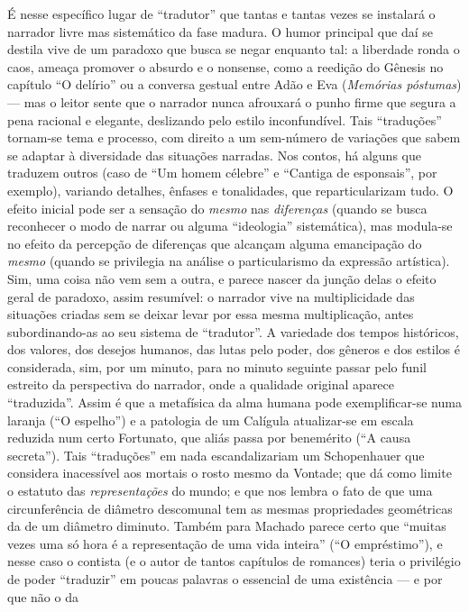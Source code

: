 É nesse específico lugar de ``tradutor'' que tantas e tantas vezes se
instalará o narrador livre mas sistemático da fase madura. O humor
principal que daí se destila vive de um paradoxo que busca se negar
enquanto tal: a liberdade ronda o caos, ameaça promover o absurdo e o
nonsense, como a reedição do Gênesis no capítulo ``O delírio'' ou a
conversa gestual entre Adão e Eva (\emph{Memórias póstumas}) --- mas o
leitor sente que o narrador nunca afrouxará o punho firme que segura a
pena racional e elegante, deslizando pelo estilo inconfundível. Tais
``traduções'' tornam-se tema e processo, com direito a um sem-número de
variações que sabem se adaptar à diversidade das situações narradas. Nos
contos, há alguns que traduzem outros (caso de ``Um homem célebre'' e
``Cantiga de esponsais'', por exemplo), variando detalhes, ênfases e
tonalidades, que reparticularizam tudo. O efeito inicial pode ser a
sensação do \emph{mesmo} nas \emph{diferenças} (quando se busca
reconhecer o modo de narrar ou alguma ``ideologia'' sistemática), mas
modula-se no efeito da percepção de diferenças que alcançam alguma
emancipação do \emph{mesmo} (quando se privilegia na análise o
particularismo da expressão artística). Sim, uma coisa não vem sem a
outra, e parece nascer da junção delas o efeito geral de paradoxo, assim
resumível: o narrador vive na multiplicidade das situações criadas sem
se deixar levar por essa mesma multiplicação, antes subordinando-as ao
seu sistema de ``tradutor''. A variedade dos tempos históricos, dos
valores, dos desejos humanos, das lutas pelo poder, dos gêneros e dos
estilos é considerada, sim, por um minuto, para no minuto seguinte
passar pelo funil estreito da perspectiva do narrador, onde a qualidade
original aparece ``traduzida''. Assim é que a metafísica da alma humana
pode exemplificar-se numa laranja (``O espelho'') e a patologia de um
Calígula atualizar-se em escala reduzida num certo Fortunato, que aliás
passa por benemérito (``A causa secreta''). Tais ``traduções'' em nada
escandalizariam um Schopenhauer que considera inacessível aos mortais o
rosto mesmo da Vontade; que dá como limite o estatuto das
\emph{representações} do mundo; e que nos lembra o fato de que uma
circunferência de diâmetro descomunal tem as mesmas propriedades
geométricas da de um diâmetro diminuto. Também para Machado parece certo
que ``muitas vezes uma só hora é a representação de uma vida inteira''
(``O empréstimo''), e nesse caso o contista (e o autor de tantos
capítulos de romances) teria o privilégio de poder ``traduzir'' em
poucas palavras o essencial de uma existência --- e por que não o da
